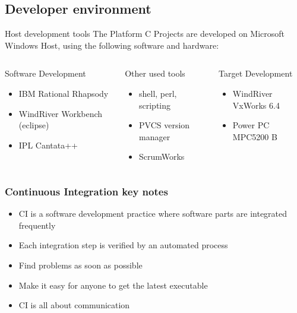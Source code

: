 \documentclass[handout]{beamer}
\begin{document}
\subsection[Developer environment]{Developer environment}
\begin{frame}{Host development tools}
The Platform C Projects are developed on Microsoft Windows Host, using the
following software and hardware:
\begin{columns}
	\begin{block}{Software Development}
	\begin{itemize}
		\item<1-> IBM Rational Rhapsody
  		\item<2-> WindRiver Workbench (eclipse) 
  		\item<3-> IPL Cantata++
    \end{itemize}
    \end{block}

	\begin{block}{Other used tools}
	\begin{itemize}
      \item<4-> shell, perl, scripting
      \item<5-> PVCS version manager
      \item<6-> ScrumWorks 
    \end{itemize}
    \end{block}

	\begin{block}{Target Development}
	\begin{itemize}
      \item<7->WindRiver VxWorks 6.4
  	  \item<8-> Power PC MPC5200 B
    \end{itemize}
    \end{block}
\end{columns}
\end{frame}

\begin{frame}
\frametitle{Continuous Integration key notes}
\begin{itemize}
  \item<1-> CI is a software development practice where software parts are
  integrated frequently
  \item<2-> Each integration step is verified by an automated process
  \item<3-> Find problems as soon as possible
  \item<4-> Make it easy for anyone to get the latest executable
  \item<5-> CI is all about communication
\end{itemize}
\end{frame}
\end{document}
